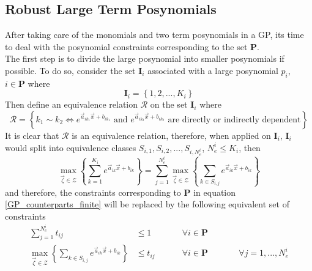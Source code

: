 \subsection{Robust Large Term Posynomials}\label{k_term}
After taking care of the monomials and two term posynomials in a GP, its time to deal with the posynomial constraints corresponding to the set $\mathbf{P}$.\\[12pt]
The first step is to divide the large posynomial into smaller posynomials if possible. To do so, consider the set $\mathbf{I}_i$ associated with a large posynomial $p_i$, $i \in \mathbf{P}$ where
\begin{equation}
\mathbf{I}_i = \left\{ 1,2,...,K_i\right\}
\label{monomials_set}
\end{equation}
Then define an equivalence relation $\mathcal{R}$ on the set $\mathbf{I}_i$ where
\begin{equation}
\mathcal{R} = \left\{k_1 \sim k_2 \iff e^{\vec{a}_{ik_1}\vec{x} + b_{ik_1}} \text{ and } e^{\vec{a}_{ik_2}\vec{x} + b_{ik_2}} \text{ are directly or indirectly dependent} \right\}
\label{equivalence_relation}
\end{equation}
It is clear that $\mathcal{R}$ is an equivalence relation, therefore, when applied on $\mathbf{I}_i$, $\mathbf{I}_i$ would split into equivalence classes $S_{i,1}, S_{i,2}, ..., S_{i,N_e^i}$, $N_e^i \leq K_i$, then
$$
\max_{\vec{\zeta} \in \mathcal{Z}} \left\{\textstyle{\sum}_{k=1}^{K_i}e^{\vec{a}_{ik}\vec{x} + b_{ik}}\right\} = \textstyle{\sum}_{j=1}^{N_e^i} \max_{\vec{\zeta} \in \mathcal{Z}} \left\{\textstyle{\sum}_{k \in S_{i,j}}e^{\vec{a}_{ik}\vec{x} + b_{ik}}\right\}
$$
and therefore, the constraints corresponding to $\mathbf{P}$ in equation \eqref{GP_counterparts_finite} will be replaced by the following equivalent set of constraints
\begin{equation}
\begin{aligned}
\textstyle{\sum}_{j=1}^{N_e^i} t_{ij} &\leq 1 \qquad &&\forall i \in \mathbf{P}\\
\max_{\vec{\zeta} \in \mathcal{Z}} \left\{\textstyle{\sum}_{k \in S_{i,j}} e^{\vec{a}_{ik}\vec{x} + b_{ik}} \right\} &\leq t_{ij} &&\forall i \in \mathbf{P} \qquad &&\forall j = 1, ..., N_e^i\\
\end{aligned}
\label{equivalent_class_setP}
\end{equation}

